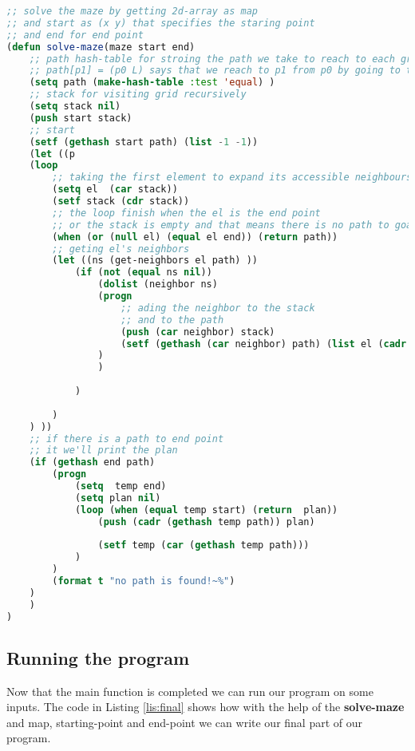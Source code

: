 \begin{lstlisting}[language=Lisp, style=mystyle,
                 caption=main function for solving the maze,
                 label=lis:solve-maze]
;; solve the maze by getting 2d-array as map
;; and start as (x y) that specifies the staring point
;; and end for end point
(defun solve-maze(maze start end)
    ;; path hash-table for stroing the path we take to reach to each grid
    ;; path[p1] = (p0 L) says that we reach to p1 from p0 by going to the left
    (setq path (make-hash-table :test 'equal) )
    ;; stack for visiting grid recursively
    (setq stack nil) 
    (push start stack)
    ;; start 
    (setf (gethash start path) (list -1 -1))
    (let ((p
    (loop
        ;; taking the first element to expand its accessible neighbours
        (setq el  (car stack))
        (setf stack (cdr stack))
        ;; the loop finish when the el is the end point
        ;; or the stack is empty and that means there is no path to goal
        (when (or (null el) (equal el end)) (return path))
        ;; geting el's neighbors
        (let ((ns (get-neighbors el path) ))
            (if (not (equal ns nil))
                (dolist (neighbor ns)
                (progn
                    ;; ading the neighbor to the stack
                    ;; and to the path
                    (push (car neighbor) stack)
                    (setf (gethash (car neighbor) path) (list el (cadr neighbor)))
                )
                )
                
            )
        
        )
    ) ))
    ;; if there is a path to end point
    ;; it we'll print the plan
    (if (gethash end path)
        (progn
            (setq  temp end)
            (setq plan nil)
            (loop (when (equal temp start) (return  plan))
                (push (cadr (gethash temp path)) plan)
                
                (setf temp (car (gethash temp path)))
            )
        )
        (format t "no path is found!~%")
    )
    )
) 
\end{lstlisting}   

\subsection{Running the program}
Now that the main function is completed we can run 
our program on some inputs. The code in Listing \ref{lis:final}
shows how with the help of the \textbf{solve-maze} and
map, starting-point and end-point we can write our final
part of our program.

